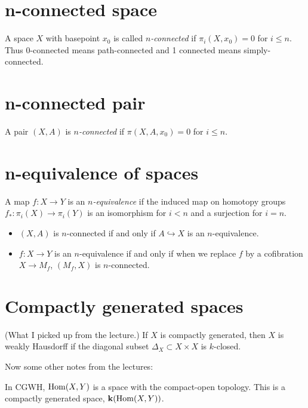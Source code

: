 \section{n-connected
space}
\label{section-n-connected-space}

A space $X$ with basepoint $x_0$ is called
{\it $n$-connected} if $\pi_i(X,x_0)=0$ for
$i\leq n$. Thus 0-connected means
path-connected and 1 connected means
simply-connected.

\section{n-connected
pair}
\label{section-n-connected-pair}

A pair $(X,A)$ is {\it $n$-connected} if
$\pi(X,A,x_0)=0$ for $i\leq n$.

\section{n-equivalence of spaces}
\label{section-n-equivalence-of-spaces}

A map $f:X\to Y$ is an {\it  $n$-equivalence}
if the induced map on homotopy groups
$f_{*}:\pi_{i}(X)\to \pi_{i}(Y)$ is an
isomorphism for $i<n$ and a surjection for
$i=n$.

\begin{remark}
\label{remark-what-i-picke-up-lectu-if}
\begin{itemize}
\item $(X,A)$ is $n$-connected if and only if
$A\hookrightarrow X$ is an $n$-equivalence.
\item $f:X\to Y$ is an $n$-equivalence if and
only if when we replace $f$ by a cofibration
$X\to M_{f}$, $(M_{f},X)$ is $n$-connected.
\end{itemize}
\end{remark}

\section{Compactly generated spaces}
\label{section-compactly-generated-spaces}

(What I picked up from the lecture.) If $X$
is compactly generated, then $X$ is
weakly Hausdorff if the diagonal subset
$\Delta_X\subset X\times X$ is
$k$-closed.

Now some other notes from the lectures:

In $\text{CGWH}$, $\mathop{\mathrm{Hom}}\nolimits(X,Y)$ is a space with
the compact-open topology.
This is a compactly generated space,
$\mathbf{k}(\mathop{\mathrm{Hom}}\nolimits(X,Y))$.

